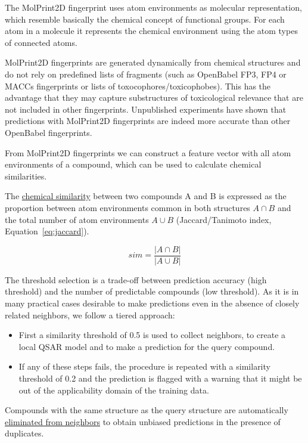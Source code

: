 \documentclass[]{achemso}
\providecommand{\tightlist}{%
  \setlength{\itemsep}{0pt}\setlength{\parskip}{0pt}}
\begin{document}
The MolPrint2D fingerprint uses atom environments as molecular
representation, which resemble basically the chemical concept of
functional groups. For each atom in a molecule it represents the
chemical environment using the atom types of connected atoms.

MolPrint2D fingerprints are generated dynamically from chemical
structures and do not rely on predefined lists of fragments (such as
OpenBabel FP3, FP4 or MACCs fingerprints or lists of
toxocophores/toxicophobes). This has the advantage that they may capture
substructures of toxicological relevance that are not included in other
fingerprints. Unpublished experiments have shown that predictions with
MolPrint2D fingerprints are indeed more accurate than other OpenBabel
fingerprints.

From MolPrint2D fingerprints we can construct a feature vector with all
atom environments of a compound, which can be used to calculate chemical
similarities.

The
\href{https://github.com/opentox/lazar/blob/loael-paper.submission/lib/similarity.rb\#L18-L20}{chemical
similarity} between two compounds A and B is expressed as the proportion
between atom environments common in both structures \(A \cap B\) and the
total number of atom environments \(A \cup B\) (Jaccard/Tanimoto index,
Equation~\ref{eq:jaccard}).

\begin{equation} sim = \frac{|A \cap B|}{|A \cup B|} \label{eq:jaccard}\end{equation}

The threshold selection is a trade-off between prediction accuracy (high
threshold) and the number of predictable compounds (low threshold). As
it is in many practical cases desirable to make predictions even in the
absence of closely related neighbors, we follow a tiered approach:

\begin{itemize}
\tightlist
\item
  First a similarity threshold of 0.5 is used to collect neighbors, to
  create a local QSAR model and to make a prediction for the query
  compound.
\item
  If any of these steps fails, the procedure is repeated with a
  similarity threshold of 0.2 and the prediction is flagged with a
  warning that it might be out of the applicability domain of the
  training data.
\end{itemize}

Compounds with the same structure as the query structure are
automatically
\href{https://github.com/opentox/lazar/blob/loael-paper.submission/lib/model.rb\#L180-L257}{eliminated
from neighbors} to obtain unbiased predictions in the presence of
duplicates.
\end{document}
